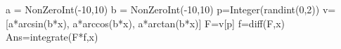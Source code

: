 \documentclass[]{ximera}
\begin{document}

\begin{sagesilent}
a = NonZeroInt(-10,10)
b = NonZeroInt(-10,10)
p=Integer(randint(0,2))
v=[a*arcsin(b*x), a*arccos(b*x), a*arctan(b*x)]
F=v[p]
f=diff(F,x)
Ans=integrate(F*f,x)
\end{sagesilent}

\end{document}
